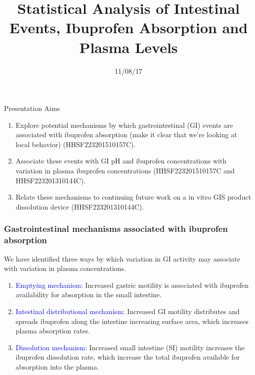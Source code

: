 \documentclass[handout]{beamer}
\title{Statistical Analysis of Intestinal Events, Ibuprofen Absorption and Plasma Levels}
\date{11/08/17}
\begin{document}
\begin{frame}
  \titlepage
\end{frame}

\begin{frame}{Presentation Aims}

	\begin{enumerate}
		\setlength\itemsep{1.25em}
		\item Explore potential mechanisms by which gastrointestinal (GI) events are associated with ibuprofen absorption (make it clear that we're looking at local behavior) (HHSF223201510157C).
		\item Associate these events with GI pH and ibuprofen concentrations with variation in plasma ibuprofen concentrations (HHSF223201510157C and HHSF223201310144C).
		\item Relate these mechanisms to continuing future work on a in vitro GIS product dissolution device (HHSF223201310144C).
	\end{enumerate}

\end{frame}


\begin{frame}\frametitle{Gastrointestinal mechanisms associated with ibuprofen absorption}

	We have identified three ways by which variation in GI activity may associate with variation in plasma concentrations.

	\bigskip

	\begin{enumerate}
		\setlength\itemsep{1em}
		\item \textcolor{blue}{Emptying mechanism}: Increased gastric motility is associated with ibuprofen availability for absorption in the small intestine.
		\item \textcolor{blue}{Intestinal distributional mechanism}: Increased GI motility distributes and spreads ibuprofen along the intestine increasing surface area, which increases plasma absorption rates.
		\item \textcolor{blue}{Dissolution mechanism}: Increased small intestine (SI) motility increases the ibuprofen dissolution rate, which increase the total ibuprofen available for absorption into the plasma.
	\end{enumerate}


\end{frame}
\end{document}
